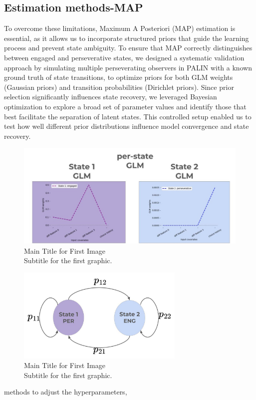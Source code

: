 \subsection {Estimation methods-MAP} 
To overcome these limitations, Maximum A Posteriori (MAP) estimation is essential, as it allows us to incorporate structured priors that guide the learning process and prevent state ambiguity. To ensure that MAP correctly distinguishes between engaged and perseverative states, we designed a systematic validation approach by simulating multiple perseverating observers in PALIN with a known ground truth of state transitions, to optimize priors for both GLM weights (Gaussian priors) and transition probabilities (Dirichlet priors). Since prior selection significantly influences state recovery, we leveraged Bayesian optimization to explore a broad set of parameter values and identify those that best facilitate the separation of latent states. This controlled setup enabled us to test how well different prior distributions influence model convergence and state recovery.
\begin{figure}[H]
    \centering
    \includegraphics[width=15cm]{MainLayout/Images/chapter7/glm_perstate.jpg}
    \caption{Main Title for First Image \\ \small Subtitle for the first graphic.}
    \label{fig:glm_perstate}
\end{figure}
\begin{figure}[H]
    \centering
    \includegraphics[width=8cm]{MainLayout/Images/chapter7/transition.jpg}
    \caption{Main Title for First Image \\ \small Subtitle for the first graphic.}
    \label{fig:transition}
\end{figure}
methods to adjust the hyperparameters,
